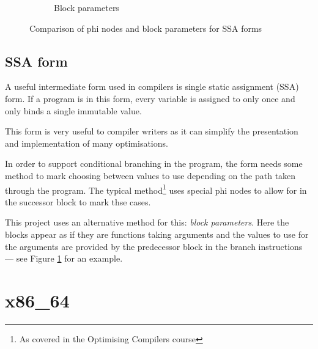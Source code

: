 \begin{figure}[h]
\begin{subfigure}[b]{0.5\textwidth}

        \caption{Block parameters}

    \end{subfigure}
    \caption{Comparison of phi nodes and block parameters for SSA forms}
    \label{fig:phi-bp}
\end{figure}

\subsection{SSA form}

A useful intermediate form used in compilers is single static assignment (SSA) form. If a program
is in this form,
every variable is assigned to only once and only binds a single immutable value.

This form is very useful to compiler writers as it can simplify the presentation and implementation
of many optimisations.

In order to support conditional branching in the program, the form needs some method to mark
choosing between values to use depending on the path taken through the program. The typical
method\footnote{As covered in the Optimising Compilers course} uses special phi nodes to allow for
in the successor block to mark thse cases.

This project uses an alternative method for this: \emph{block parameters}.
Here the blocks appear as if they are functions taking arguments and the values to use for the
arguments are provided by the predecessor block in the branch instructions --- see Figure
\ref{fig:phi-bp} for an example.

\section{x86\_64}

